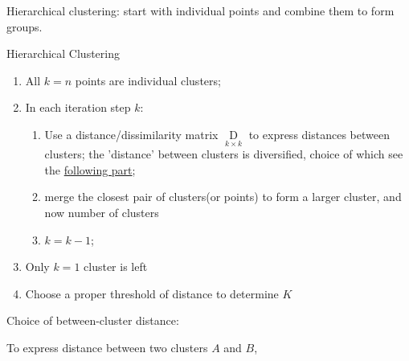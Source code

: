     Hierarchical clustering: start with individual points and combine them to form groups. 
    \begin{algorithm}{Hierarchical Clustering}
        \begin{enumerate}[topsep=2pt,itemsep=2pt]
        \item All $ k=n $ points are individual clusters;
        \item In each iteration step $ k $: 
        \begin{enumerate}[topsep=2pt,itemsep=2pt]
            \item Use a distance/dissimilarity matrix $ \mathop{D}\limits_{k\times k}  $ to express distances between clusters; the 'distance' between clusters is diversified, choice of which see the \hyperlink{BetweenClusterD}{following part};
            \item merge the closest pair of clusters(or points) to form a larger cluster, and now number of clusters 
            \item $ k = k-1 $;
        \end{enumerate}
        \item Only $ k=1 $ cluster is left
        \item Choose a proper threshold of distance to determine $ K $
        \end{enumerate}
    \end{algorithm}
        

    
    
\begin{point}
    \hypertarget{BetweenClusterD}{Choice of between-cluster distance:} To express distance between two clusters $ A $ and $ B $,
\end{point}

